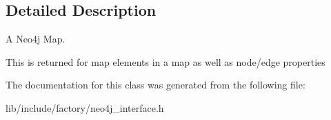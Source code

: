 \subsection{Detailed Description}
A Neo4j Map. 

This is returned for map elements in a map as well as node/edge properties 

The documentation for this class was generated from the following file\-:\begin{DoxyCompactItemize}
\item 
lib/include/factory/neo4j\-\_\-interface.\-h\end{DoxyCompactItemize}
